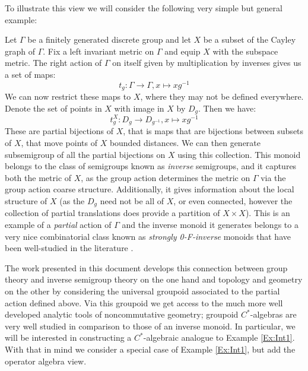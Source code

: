 To illustrate this view we will consider the following very simple but general example:
\begin{example}\label{Ex:Int1}
Let $\Gamma$ be a finitely generated discrete group and let $X$ be a subset of the Cayley graph of $\Gamma$. Fix a left invariant metric on $\Gamma$ and equip $X$ with the subspace metric. The right action of $\Gamma$ on itself given by multiplication by inverses gives us a set of maps:
\begin{equation*}
t_{g}: \Gamma \rightarrow \Gamma , x \mapsto xg^{-1}
\end{equation*}
We can now restrict these maps to $X$, where they may not be defined everywhere. Denote the set of points in $X$ with image in $X$ by $D_{g}$. Then we have:
\begin{equation*}
t_{g}^{X}: D_{g} \rightarrow D_{g^{-1}} , x \mapsto xg^{-1}
\end{equation*}
These are partial bijections of $X$, that is maps that are bijections between subsets of $X$, that move points of $X$ bounded distances. We can then generate subsemigroup of all the partial bijections on $X$ using this collection. This monoid belongs to the class of semigroups known as \textit{inverse} semigroups, and it captures both the metric of $X$, as the group action determines the metric on $\Gamma$ via the group action coarse structure. Additionally, it gives information about the local structure of $X$ (as the $D_{g}$ need not be all of $X$, or even connected, however the collection of partial translations does provide a partition of $X\times X$). This is an example of a \textit{partial} action of $\Gamma$ and the inverse monoid it generates belongs to a very nice combinatorial class known as \textit{strongly 0-F-inverse} monoids that have been well-studied in the literature \cite{MR1721768,MR1798993,Nor-2012}.
\end{example}

The work presented in this document develops this connection between group theory and inverse semigroup theory on the one hand and topology and geometry on the other by considering the universal groupoid associated to the partial action defined above. Via this groupoid we get access to the much more well developed analytic tools of noncommutative geometry; groupoid $C^{*}$-algebras are very well studied in comparison to those of an inverse monoid. In particular, we will be interested in constructing a $C^{*}$-algebraic analogue to Example \ref{Ex:Int1}. With that in mind we consider a special case of Example \ref{Ex:Int1}, but add the operator algebra view.

